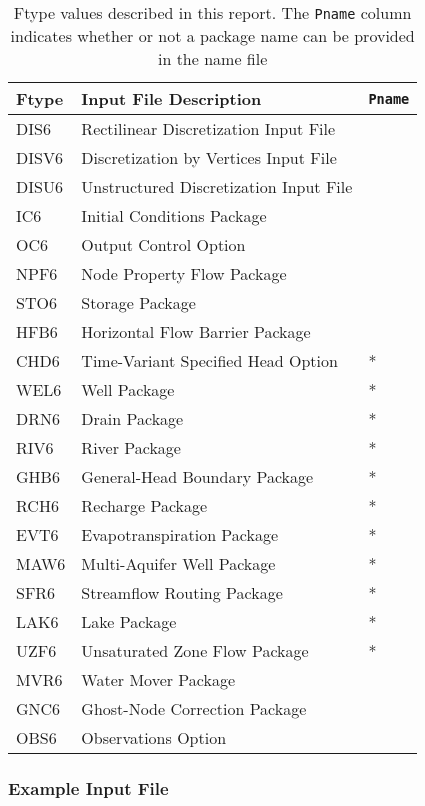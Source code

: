 \begin{table}[H]
\caption{Ftype values described in this report.  The \texttt{Pname} column indicates whether or not a package name can be provided in the name file}
\small
\begin{center}
\begin{tabular*}{\columnwidth}{l l l}
\hline
\hline
Ftype & Input File Description & \texttt{Pname}\\
\hline
DIS6 & Rectilinear Discretization Input File \\
DISV6 & Discretization by Vertices Input File \\
DISU6 & Unstructured Discretization Input File \\
IC6 & Initial Conditions Package \\
OC6 & Output Control Option \\
NPF6 & Node Property Flow Package \\ 
STO6 & Storage Package \\
HFB6 & Horizontal Flow Barrier Package\\
CHD6 & Time-Variant Specified Head Option & * \\
WEL6 & Well Package & * \\
DRN6 & Drain Package & * \\
RIV6 & River Package & * \\
GHB6 & General-Head Boundary Package & * \\
RCH6 & Recharge Package & * \\
EVT6 & Evapotranspiration Package & * \\
MAW6 & Multi-Aquifer Well Package & * \\
SFR6 & Streamflow Routing Package & * \\
LAK6 & Lake Package & * \\
UZF6 & Unsaturated Zone Flow Package & * \\
MVR6 & Water Mover Package \\
GNC6 & Ghost-Node Correction Package \\
OBS6 & Observations Option \\
\hline 
\end{tabular*}
\label{table:ftype}
\end{center}
\normalsize
\end{table}

\vspace{5mm}
\subsubsection{Example Input File}


